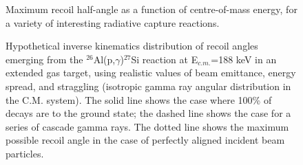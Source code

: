 \begin{figure}
\caption{Maximum recoil half-angle as a function of centre-of-mass energy, for a variety of interesting radiative capture reactions.}
\label{fig:coneangles}       %
\end{figure}

\begin{figure}
\caption{Hypothetical inverse kinematics distribution of recoil angles emerging from the $^{26}$Al(p,$\gamma$)$^{27}$Si reaction at E$_{c.m.}$=188 keV in an extended gas target, using realistic values of beam emittance, energy spread, and straggling (isotropic gamma ray angular distribution in the C.M. system). The solid line shows the case where 100\% of decays are to the ground state; the dashed line shows the case for a series of cascade gamma rays. The dotted line shows the maximum possible recoil angle in the case of perfectly aligned incident beam particles. }
\label{fig:26altheta}       %
\end{figure}

